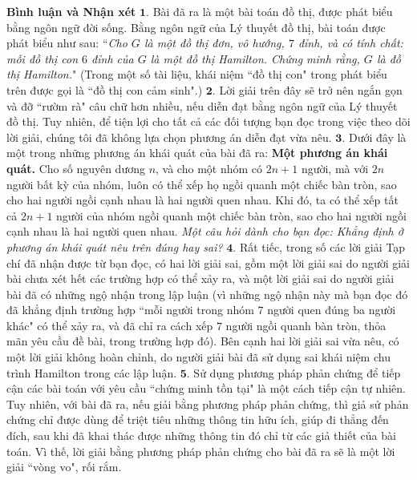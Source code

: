 \begin{multicols}{2}
	\vskip 0.05cm
	\textbf{\color{thachthuctoanhoc}Bình luận và Nhận xét}
	\vskip 0.05cm
	$\pmb{1.}$ Bài đã ra là một bài toán đồ thị, được phát biểu bằng ngôn ngữ đời sống. Bằng ngôn ngữ của Lý thuyết đồ thị, bài toán được phát biểu như sau:
	\vskip 0.05cm
	``\textit{Cho $G$ là một đồ thị đơn, vô hướng, $7$ đỉnh, và có tính chất: mỗi đồ thị con $6$ đỉnh của $G$ là một đồ thị Hamilton. Chứng minh rằng, $G$ là đồ thị Hamilton.}"
	\vskip 0.05cm
	(Trong một số tài liệu, khái niệm ``đồ thị con" trong phát biểu trên được gọi là ``đồ thị con cảm sinh".)
	\vskip 0.05cm
	$\pmb{2.}$ Lời giải trên đây sẽ trở nên ngắn gọn và đỡ ``rườm rà" câu chữ hơn nhiều, nếu diễn đạt bằng ngôn ngữ của Lý thuyết đồ thị. Tuy nhiên, để tiện lợi cho tất cả các đối tượng bạn đọc trong việc theo dõi lời giải, chúng tôi đã không lựa chọn phương án diễn đạt vừa nêu.
	\vskip 0.05cm
	$\pmb{3.}$ Dưới đây là một trong những phương án khái quát của bài đã ra:
	\vskip 0.05cm
	\textbf{\color{thachthuctoanhoc}Một phương án khái quát.} Cho số nguyên dương $n$, và cho một nhóm có $2n + 1$ người, mà với $2n$ người bất kỳ của nhóm, luôn có thể xếp họ ngồi quanh một chiếc bàn tròn, sao cho hai người ngồi cạnh nhau là hai người quen nhau. Khi đó, ta có thể xếp tất cả $2n + 1$ người của nhóm ngồi quanh một chiếc bàn tròn, sao cho hai người ngồi cạnh nhau là hai người quen nhau.
	\vskip 0.05cm
	\textit{Một câu hỏi dành cho bạn đọc: Khẳng định ở phương án khái quát nêu trên đúng hay sai?}
	\vskip 0.05cm
	$\pmb{4.}$ Rất tiếc, trong số các lời giải Tạp chí đã nhận được từ bạn đọc, có hai lời giải sai, gồm một lời giải sai do người giải bài chưa xét hết các trường hợp có thể xảy ra, và một lời giải sai do người giải bài đã có những ngộ nhận trong lập luận (vì những ngộ nhận này mà bạn đọc đó đã khẳng định trường hợp ``mỗi người trong nhóm $7$ người quen đúng ba người khác" có thể xảy ra, và đã chỉ ra cách xếp $7$ người ngồi quanh bàn tròn, thỏa mãn yêu cầu đề bài, trong trường hợp đó). Bên cạnh hai lời giải sai vừa nêu, có một lời giải không hoàn chỉnh, do người giải bài đã sử dụng sai khái niệm chu trình Hamilton trong các lập luận.
	\vskip 0.05cm
	$\pmb{5.}$ Sử dụng phương pháp phản chứng để tiếp cận các bài toán với yêu cầu ``chứng minh tồn tại" là một cách tiếp cận tự nhiên. Tuy nhiên, với bài đã ra, nếu giải bằng phương pháp phản chứng, thì giả sử phản chứng chỉ được dùng để triệt tiêu những thông tin hữu ích, giúp đi thẳng đến đích, sau khi đã khai thác được những thông tin đó chỉ từ các giả thiết của bài toán. Vì thế, lời giải bằng phương pháp phản chứng cho bài đã ra sẽ là một lời giải ``vòng vo", rối rắm.

\end{multicols}
